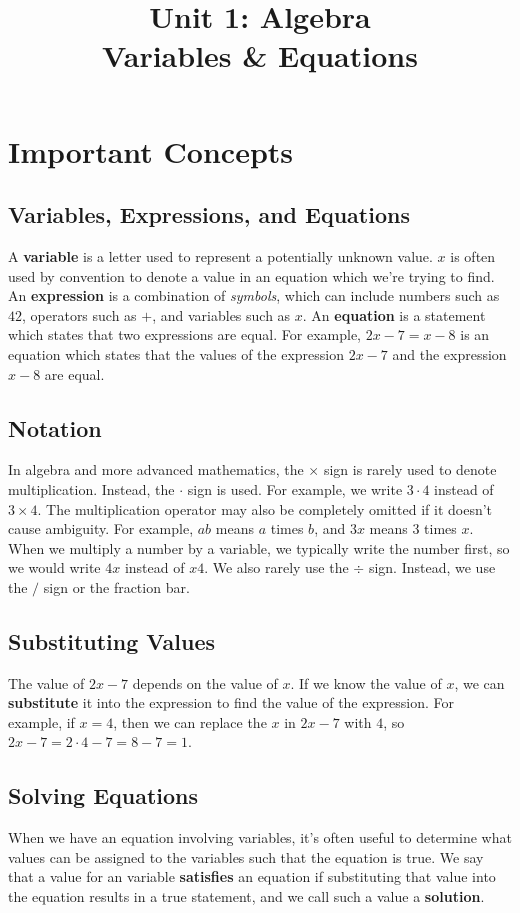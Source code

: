 \documentclass{article}
\title{Unit 1: Algebra \\ Variables \& Equations}
\author{}
\date{}
\begin{document}
    \maketitle
    \section*{Important Concepts}
    \subsection*{Variables, Expressions, and Equations}
    A \textbf{variable} is a letter used to represent a potentially unknown value. $x$ is often used by convention to denote a value in an equation which we're trying to find. An \textbf{expression} is a combination of \emph{symbols}, which can include numbers such as $42$, operators such as $+$, and variables such as $x$. An \textbf{equation} is a statement which states that two expressions are equal. For example, $2x - 7 = x - 8$ is an equation which states that the values of the expression $2x - 7$ and the expression $x - 8$ are equal.
    \subsection*{Notation}
    In algebra and more advanced mathematics, the $\times$ sign is rarely used to denote multiplication. Instead, the $\cdot$ sign is used. For example, we write $3 \cdot 4$ instead of $3 \times 4$. The multiplication operator may also be completely omitted if it doesn't cause ambiguity. For example, $ab$ means $a$ times $b$, and $3x$ means $3$ times $x$. When we multiply a number by a variable, we typically write the number first, so we would write $4x$ instead of $x4$. We also rarely use the $\div$ sign. Instead, we use the $/$ sign or the fraction bar.
    \subsection*{Substituting Values}
    The value of $2x - 7$ depends on the value of $x$. If we know the value of $x$, we can \textbf{substitute} it into the expression to find the value of the expression. For example, if $x = 4$, then we can replace the $x$ in $2x - 7$ with $4$, so $2x - 7 = 2 \cdot 4 - 7 = 8 - 7 = 1$.
    \subsection*{Solving Equations}
    When we have an equation involving variables, it's often useful to determine what values can be assigned to the variables such that the equation is true. We say that a value for an variable \textbf{satisfies} an equation if substituting that value into the equation results in a true statement, and we call such a value a \textbf{solution}.
\end{document}
